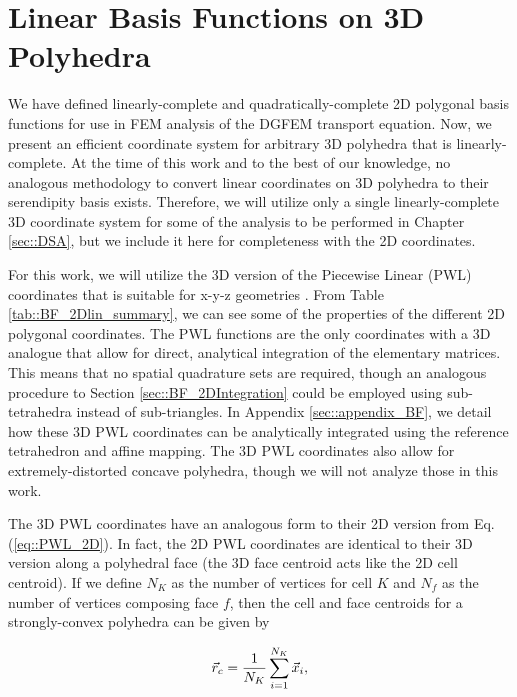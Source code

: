 \section{Linear Basis Functions on 3D Polyhedra}
\label{sec::BF_3DLinear}


We have defined linearly-complete and quadratically-complete 2D polygonal basis functions for use in FEM analysis of the DGFEM transport equation. Now, we present an efficient coordinate system for arbitrary 3D polyhedra that is linearly-complete. At the time of this work and to the best of our knowledge, no analogous methodology to convert linear coordinates on 3D polyhedra to their serendipity basis exists. Therefore, we will utilize only a single linearly-complete 3D coordinate system for some of the analysis to be performed in Chapter \ref{sec::DSA}, but we include it here for completeness with the 2D coordinates.

For this work, we will utilize the 3D version of the Piecewise Linear (PWL) coordinates that is suitable for x-y-z geometries \cite{bailey2008phd}. From Table \ref{tab::BF_2Dlin_summary}, we can see some of the properties of the different 2D polygonal coordinates. The PWL functions are the only coordinates with a 3D analogue that allow for direct, analytical integration of the elementary matrices. This means that no spatial quadrature sets are required, though an analogous procedure to Section \ref{sec::BF_2DIntegration} could be employed using sub-tetrahedra instead of sub-triangles. In Appendix \ref{sec::appendix_BF}, we detail how these 3D PWL coordinates can be analytically integrated using the reference tetrahedron and affine mapping. The 3D PWL coordinates also allow for extremely-distorted concave polyhedra, though we will not analyze those in this work.

The 3D PWL coordinates have an analogous form to their 2D version from Eq. (\ref{eq::PWL_2D}). In fact, the 2D PWL coordinates are identical to their 3D version along a polyhedral face (the 3D face centroid acts like the 2D cell centroid). If we define $N_K$ as the number of vertices for cell $K$ and $N_f$ as the number of vertices composing face $f$, then the cell and face centroids for a strongly-convex polyhedra can be given by

\begin{equation}
\label{eq::PWL_3D_cell_center}
	\vec{r}_{c} = \frac{1}{N_K} \sum\displaylimits_{i=1}^{N_K} \vec{x}_i ,
\end{equation}

